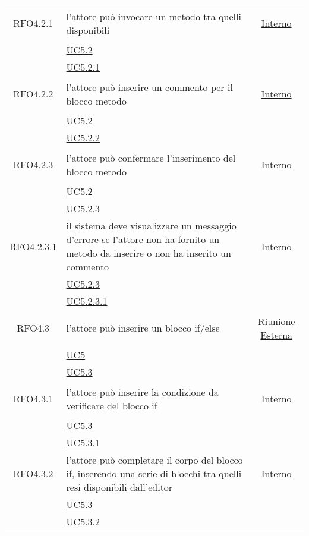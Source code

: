 \begin{longtable}{|c|>{\centering}m{7cm}|c|}
\hypertarget{RFO4.2.1}{RFO4.2.1} & l'attore può invocare un metodo tra quelli disponibili & \hyperlink{Interno}{Interno}\\
& \hyperref[UC5.2]{UC5.2}\\
& \hyperref[UC5.2.1]{UC5.2.1}\\ \hline

\hypertarget{RFO4.2.2}{RFO4.2.2} & l’attore può inserire un commento per il blocco metodo & \hyperlink{Interno}{Interno}\\
& \hyperref[UC5.2]{UC5.2}\\
& \hyperref[UC5.2.2]{UC5.2.2}\\ \hline

\hypertarget{RFO4.2.3}{RFO4.2.3} & l’attore può confermare l'inserimento del blocco metodo & \hyperlink{Interno}{Interno}\\
& \hyperref[UC5.2]{UC5.2}\\
& \hyperref[UC5.2.3]{UC5.2.3}\\ \hline

\hypertarget{RFO4.2.3.1}{RFO4.2.3.1} & il sistema deve visualizzare un messaggio d’errore se l'attore non ha fornito un metodo da inserire o non ha inserito un commento & \hyperlink{Interno}{Interno}\\
& \hyperref[UC5.2.3]{UC5.2.3}\\
& \hyperref[UC5.2.3.1]{UC5.2.3.1}\\ \hline

\hypertarget{RFO4.3}{RFO4.3} & l'attore può inserire un blocco if/else & \hyperlink{Riunione Esterna}{Riunione Esterna}\\
& \hyperref[UC5]{UC5}\\
& \hyperref[UC5.3]{UC5.3}\\ \hline

\hypertarget{RFO4.3.1}{RFO4.3.1} & l'attore può inserire la condizione da verificare del blocco if & \hyperlink{Interno}{Interno}\\
& \hyperref[UC5.3]{UC5.3}\\
& \hyperref[UC5.3.1]{UC5.3.1}\\ \hline

\hypertarget{RFO4.3.2}{RFO4.3.2} & l'attore può completare il corpo del blocco if, inserendo una serie di blocchi tra quelli resi disponibili dall'editor  & \hyperlink{Interno}{Interno}\\
& \hyperref[UC5.3]{UC5.3}\\
& \hyperref[UC5.3.2]{UC5.3.2}\\ \hline


\end{longtable}

